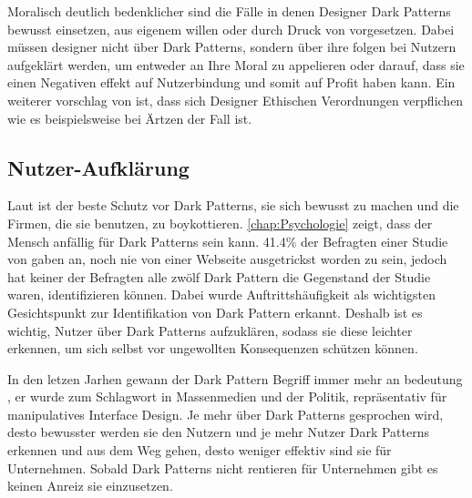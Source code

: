 \documentclass[conference,compsoc,final,a4paper]{IEEEtran}
\begin{document}
Moralisch deutlich bedenklicher sind die Fälle in denen Designer Dark Patterns bewusst einsetzen, aus eigenem willen oder durch Druck von vorgesetzen. Dabei müssen designer nicht über Dark Patterns, sondern über ihre folgen bei Nutzern aufgeklärt werden, um entweder an Ihre Moral zu appelieren oder darauf, dass sie einen Negativen effekt auf Nutzerbindung und somit auf Profit haben kann. Ein weiterer vorschlag von \citeauthor*{Gray_2018} \autocite{Gray_2018} ist, dass sich Designer Ethischen Verordnungen verpflichen wie es beispielsweise bei Ärtzen der Fall ist. 

\subsection{Nutzer-Aufklärung}
Laut \citeauthor{Brignull} \autocite{Brignull} ist der beste Schutz vor Dark Patterns, sie sich bewusst zu machen und die Firmen, die sie benutzen, zu boykottieren. \autoref{chap:Psychologie} zeigt, dass der Mensch anfällig für Dark Patterns sein kann. 41.4\% der Befragten einer Studie von \citeauthor{M.Bhoot2020} \autocite{M.Bhoot2020} gaben an, noch nie von einer Webseite ausgetrickst worden zu sein, jedoch hat keiner der Befragten alle zwölf Dark Pattern die Gegenstand der Studie waren, identifizieren können. Dabei wurde Auftrittshäufigkeit als wichtigsten Gesichtspunkt zur Identifikation von Dark Pattern erkannt. Deshalb ist es wichtig, Nutzer über Dark Patterns aufzuklären, sodass sie diese leichter erkennen, um sich selbst vor ungewollten Konsequenzen schützen können.

In den letzen Jarhen gewann der Dark Pattern Begriff immer mehr an bedeutung \autocite{Chivukula_2019}, er wurde zum Schlagwort in Massenmedien und der Politik, repräsentativ für manipulatives Interface Design. Je mehr über Dark Patterns gesprochen wird, desto bewusster werden sie den Nutzern und je mehr Nutzer Dark Patterns erkennen und aus dem Weg gehen, desto weniger effektiv sind sie für Unternehmen. Sobald Dark Patterns nicht rentieren für Unternehmen gibt es keinen Anreiz sie einzusetzen.
\end{document}
